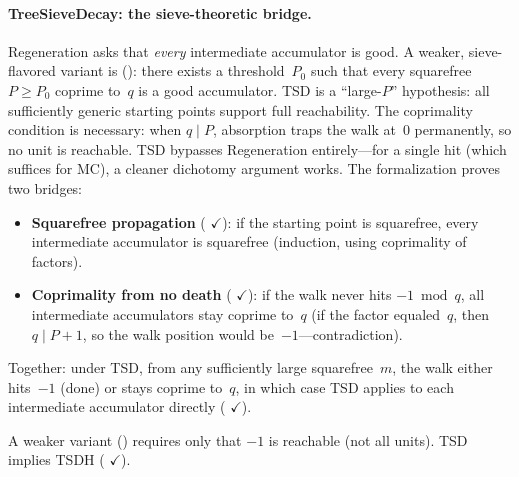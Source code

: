 \paragraph{TreeSieveDecay: the sieve-theoretic bridge.}
Regeneration asks that \emph{every} intermediate accumulator is good.
A weaker, sieve-flavored variant is 
():
there exists a threshold~$P_0$ such that every squarefree~$P \geq P_0$
coprime to~$q$ is a good accumulator.
TSD is a ``large-$P$'' hypothesis: all sufficiently generic starting
points support full reachability.
The coprimality condition is necessary: when $q \mid P$, absorption
traps the walk at~$0$ permanently, so no unit is reachable.
TSD bypasses Regeneration entirely---for a single hit (which suffices
for MC), a cleaner dichotomy argument works.
The formalization proves two bridges:
\begin{itemize}
\item \textbf{Squarefree propagation}
(
{\color{leanink}$\checkmark$}):
if the starting point is squarefree, every intermediate accumulator
is squarefree (induction, using coprimality of factors).
\item \textbf{Coprimality from no death}
(
{\color{leanink}$\checkmark$}):
if the walk never hits $-1 \bmod q$, all intermediate accumulators
stay coprime to~$q$ (if the factor equaled~$q$, then
$q \mid P{+}1$, so the walk position would be~$-1$---contradiction).
\end{itemize}
Together: under TSD, from any sufficiently large squarefree~$m$,
the walk either hits~$-1$ (done) or stays coprime to~$q$, in which
case TSD applies to each intermediate accumulator directly
(
{\color{leanink}$\checkmark$}).

A weaker variant 
()
requires only that $-1$ is reachable (not all units).
TSD implies TSDH
(
{\color{leanink}$\checkmark$}).


